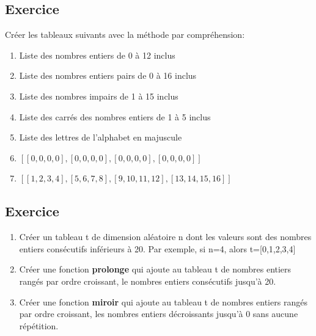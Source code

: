 \documentclass[11pt,a4paper]{article}
\newcounter{numexo}
\begin{document}
\addtocounter{numexo}{1}
\subsection*{\Large Exercice \thenumexo }
Créer les tableaux suivants avec la méthode par compréhension:
\begin{enumerate}
\item Liste des nombres entiers de 0 à 12 inclus
\item Liste des nombres entiers pairs de 0 à 16 inclus
\item Liste des nombres impairs de 1 à 15 inclus
\item Liste des carrés des nombres entiers de 1 à 5 inclus
\item Liste des lettres de l'alphabet en majuscule
\item $[[0, 0, 0, 0], [0, 0, 0, 0], [0, 0, 0, 0], [0, 0, 0, 0]]$
\item $[[1, 2, 3, 4], [5, 6, 7, 8], [9, 10, 11, 12], [13, 14, 15, 16]]$
\end{enumerate}


\addtocounter{numexo}{1}
\subsection*{\Large Exercice \thenumexo }
\begin{enumerate}
\item Créer un tableau t de dimension aléatoire n dont les valeurs sont des nombres entiers consécutifs inférieurs à 20. Par exemple, si n=4, alors t=[0,1,2,3,4]
\item Créer une fonction \textbf{prolonge} qui ajoute au tableau t de nombres entiers rangés par ordre croissant, le nombres entiers consécutifs jusqu'à 20.
\item Créer une fonction \textbf{miroir} qui ajoute au tableau t de nombres entiers rangés par ordre croissant, les nombres entiers décroissants jusqu'à 0 sans aucune répétition.
\end{enumerate}


\addtocounter{numexo}{1}
\end{document}
